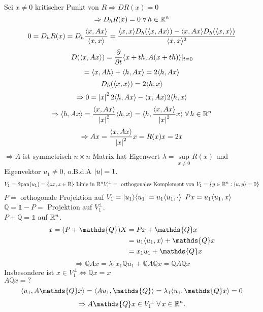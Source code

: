 \documentclass[../ana2.tex]{subfiles}
\begin{document}
\begin{bew}
    Sei \(x \neq 0\) kritischer Punkt von \(R \Rightarrow D R(x) = 0\)
    \[ \Rightarrow D_h R(x) = 0 \; \forall h \in \R^n \]
    \[ 0 = D_hR(x) = D_h \frac{\langle x, Ax \rangle}{\langle x, x \rangle}
    = \frac{ \langle x, x \rangle D_h(\langle x, Ax \rangle) 
    - \langle x, Ax \rangle D_h(\langle x, x \rangle) }{\langle x, x \rangle^2} \]
    \[ D(\langle x, Ax \rangle) = \frac{\partial}{\partial t} \langle x+th, A(x+th) \rangle \vert_{t=0} \]
    \[ = \langle x, Ah \rangle + \langle h, Ax \rangle = 2 \langle h, Ax \rangle \]
    \[ D_h(\langle x, x \rangle) = 2 \langle h, x \rangle \]
    \[ \Rightarrow 0 = \left|x\right|^2 2 \langle h, Ax \rangle - \langle x, Ax \rangle
    2 \langle h, x \rangle \]
    \[ \Rightarrow \scalarprod{h}{Ax} = \frac{\scalarprod{x}{Ax}}{\abs{x}^2}
    \scalarprod{h}{x} = \scalarprod{h}{\frac{\scalarprod{x}{Ax}}{\abs{x}^2}x} \; \forall h \in \R^n  \]
    \[ \Rightarrow Ax = \frac{\langle x, Ax \rangle}{\left|x\right|^2}x = R(x)x = 2x \]
    \( \Rightarrow A\) ist symmetrisch \(n \times n\) Matrix hat Eigenwert 
    \(\lambda = \underset{x \neq 0}{\sup} R(x)\) und Eigenvektor \(u_1 \neq 0\),
    o.B.d.A \(\left|u\right| = 1\).    
    \begin{align*}
        V_1 = \mathrm{Span}(u_1) = \{zx, z \in \mathbb{R}\} \text{ Linie in }\mathbb{R}^n
        V_1^\bot = \text{ orthogonales Komplement von } V_1 
        = \{y \in \mathbb{R}^n: \langle u, y \rangle = 0\}
    \end{align*}
    \( P = \) orthogonale Projektion auf \(V_1 = |u_1 \rangle \langle u_1 | 
    = u_1 \langle u_1, \cdot \rangle \)
    \(Px = u_1 \langle u_1, x \rangle\)\\
    \( \mathds{Q} = \mathds{1} - P = \) Projektion auf \(V_1^\bot\).\\
    \(P + \mathds{Q} = \mathds{1}\) auf \(\mathbb{R}^n\).    
    \begin{align*}
        x = (P + \mathds{Q})X &= Px + \mathds{Q}x \\
        &= u_1 \scalarprod{u_1}{x} + \mathds{Q}x \\
        &= x_1 u_1 + \mathds{Q}x
    \end{align*}
    \[ \Rightarrow \mathds{Q} A x 
    = \lambda_1 x_1 \mathds{Q} u_1 + \mathds{Q} A \mathds{Q} x
    = \mathds{Q}A\mathds{Q}x \]
    Insbesondere ist \(x \in V_1^\bot \Leftrightarrow \mathds{Q}x = x\)\\
    \( A \mathds{Q}x = ? \)
    \[ \scalarprod{u_1}{A\mathds{Q}x} = \scalarprod{Au_1}{\mathds{Q}}
    = \lambda_1 \scalarprod{u_1}{\mathds{Q}x} = 0\]    
    \[ \Rightarrow A\mathds{Q}x \in V_1^\bot \;\forall x \in \R^n. \]

\end{bew}
\end{document}
